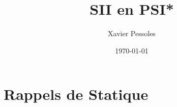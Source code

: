 \documentclass[
	fontsize=10pt, %
	twoside=true, %
]{kaobook}
\newcommand{\repRel}{../../..}
\newcommand{\repStyle}{\repRel/Style}
\begin{document}

\titlehead{Document Template}
\title[SII en PSI*]{SII en PSI*}
\author[XP]{Xavier Pessoles}
\date{\today}

%
\frontmatter %
%

%

%
\mainmatter %



\setcounter{margintocdepth}{\sectiontocdepth}
\marginlayout
\graphicspath{{\repStyle/png}}

\pagestyle{xp.scrheadings}


%



\newcommand{\repExo}{Application_01_ROV}
\newcommand{\nomExo}{Application_01_ROV}

\livrettrue %
\collefalse


\setcounter{chapter}{5}


\setchapterpreamble[u]{\margintoc}
\chapter{Rappels de Statique}


\end{document}
